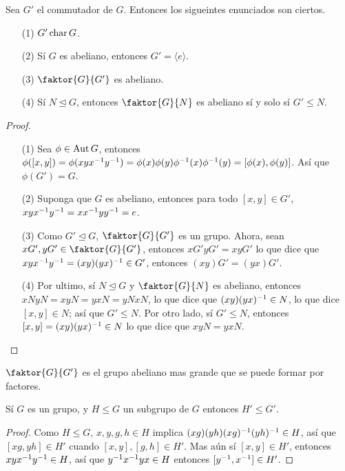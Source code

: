 \begin{lemma}\label{11.48}
    Sea $G'$ el commutador de $G$. Entonces los sigueintes enunciados son
    ciertos.
    \begin{enumerate}
        \item[(1)] $G' \operatorname{char} G$.

        \item[(2)] S\'i $G$ es abeliano, entonces  $G'=\langle e \rangle$.

        \item[(3)] $\faktor{G}{G'}$ es abeliano.

        \item[(4)] S\'i $N \unlhd G$, entonces  $\faktor{G}{N}$ es abeliano s\'i
            y solo s\'i $G' \leq N$.
    \end{enumerate}
\end{lemma}
\begin{proof}
    \begin{enumerate}
        \item[(1)] Sea $\phi \in \operatorname{Aut}{G}$, entonces $\phi([x,y])
            =\phi(xyx^{-1}y^{-1})=\phi(x)\phi(y)\phi^{-1}(x)\phi^{-1}(y)
            =[\phi(x),\phi(y)]$. As\'i que $\phi(G')=G$.

        \item[(2)] Suponga que $G$ es abeliano, entonces para todo  $[x,y] \in
            G'$, $xyx^{-1}y^{-1}=xx^{-1}yy^{-1}=e$.

        \item[(3)] Como $G' \unlhd G$,  $\faktor{G}{G'}$ es un grupo. Ahora,
            sean $xG',yG' \in \faktor{G}{G'}$, entonces $xG'yG'=xyG'$ lo que
            dice que  $xyx^{-1}y^{-1}=(xy)(yx)^{-1} \in G'$, entonces
            $(xy)G'=(yx)G'$.

        \item[(4)] Por ultimo, s\'i $N \unlhd G$ y  $\faktor{G}{N}$ es abeliano,
            entonces $xNyN=xyN=yxN=yNxN$, lo que dice que  $(xy)(yx)^{-1} \in
            N$, lo que dice $[x,y] \in N$; as\'i que $G' \leq N$. Por otro lado,
            s\'i  $G' \leq N$, entonces  $[x,y]=(xy)(yx)^{-1} \in N$ lo que
            dice que $xyN=yxN$.
    \end{enumerate}
\end{proof}
\begin{corollary}
    $\faktor{G}{G'}$ es el grupo abeliano mas grande que se puede formar por
    factores.
\end{corollary}

\begin{lemma}\label{11.49}
    S\'i $G$ es un grupo, y  $H \leq G$ un subgrupo de  $G$ entonces  $H' \leq
    G'$.
\end{lemma}
\begin{proof}
    Como $H \leq G$,  $x,y,g,h \in H$ implica $(xg)(yh)(xg)^{-1}(yh)^{-1} \in
    H$, as\'i que $[xg,yh] \in H'$ cuando $[x,y],[g,h] \in H'$. Mas a\'un s\'i
    $[x,y] \in H'$, entonces $xyx^{-1}y^{-1} \in H$, as\'i que
    $y^{-1}x^{-1}yx \in H$ entonces $[y^{-1},x^{-1}] \in H'$.
\end{proof}

